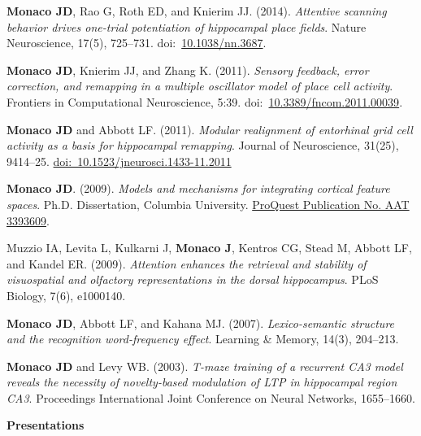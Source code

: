 \documentclass[10pt]{article}
\begin{document}
\begin{description}
\item \textbf{Monaco JD}, Rao G, Roth ED, and Knierim JJ. (2014). \emph{Attentive scanning behavior drives one-trial potentiation of hippocampal place fields}. Nature Neuroscience, 17(5), 725--731. doi:~\href{http://dx.doi.org/10.1038/nn.3687}{10.1038/nn.3687}.
\item \textbf{Monaco JD}, Knierim JJ, and Zhang K. (2011). \emph{Sensory feedback, error correction, and remapping in a multiple oscillator model of place cell activity}. Frontiers in Computational Neuroscience, 5:39. doi:~\href{http://dx.doi.org/10.3389/fncom.2011.00039}{10.3389/fncom.2011.00039}.
\item \textbf{Monaco JD} and Abbott LF. (2011). \emph{Modular realignment of entorhinal grid cell activity as a basis for hippocampal remapping}. Journal of Neuroscience, 31(25), 9414--25. \href{http://dx.doi.org/10.1523/JNEUROSCI.1433-11.2011}{doi:~10.1523/jneurosci.1433-11.2011}
\item \textbf{Monaco JD}. (2009). \emph{Models and mechanisms for integrating cortical feature spaces}. Ph.D. Dissertation, Columbia University. \href{http://gradworks.umi.com/33/93/3393609.html}{ProQuest Publication No. AAT 3393609}.
\item Muzzio IA, Levita L, Kulkarni J, \textbf{Monaco J}, Kentros CG, Stead M, Abbott LF, and Kandel ER. (2009). \emph{Attention enhances the retrieval and stability of visuospatial and olfactory representations in the dorsal hippocampus}. PLoS Biology, 7(6), e1000140.
\item \textbf{Monaco JD}, Abbott LF, and Kahana MJ. (2007). \emph{Lexico-semantic structure and the recognition word-frequency effect}. Learning \& Memory, 14(3), 204--213. 
\item \textbf{Monaco JD} and Levy WB. (2003). \emph{T-maze training of a recurrent CA3 model reveals the necessity of novelty-based modulation of LTP in hippocampal region CA3}. Proceedings International Joint Conference on Neural Networks, 1655--1660.\nopagebreak
\end{description}

{\large \textbf{Presentations}}\nopagebreak
\end{document}
